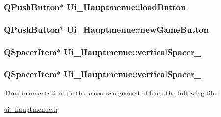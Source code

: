 \hypertarget{classUi__Hauptmenue_a9f1fdc0227d3ef11b7b7960a97b02f0d}{
\subsubsection[{load\-Button}]{\setlength{\rightskip}{0pt plus 5cm}Q\-Push\-Button$\ast$ Ui\-\_\-\-Hauptmenue\-::load\-Button}}\label{classUi__Hauptmenue_a9f1fdc0227d3ef11b7b7960a97b02f0d}
\hypertarget{classUi__Hauptmenue_a1ba53453bc65f18d70d89ce1bb5e242b}{
\subsubsection[{new\-Game\-Button}]{\setlength{\rightskip}{0pt plus 5cm}Q\-Push\-Button$\ast$ Ui\-\_\-\-Hauptmenue\-::new\-Game\-Button}}\label{classUi__Hauptmenue_a1ba53453bc65f18d70d89ce1bb5e242b}
\hypertarget{classUi__Hauptmenue_a49a9051523254188bf00ad9086998099}{
\subsubsection[{vertical\-Spacer\-\_\-4}]{\setlength{\rightskip}{0pt plus 5cm}Q\-Spacer\-Item$\ast$ Ui\-\_\-\-Hauptmenue\-::vertical\-Spacer\-\_}}\label{classUi__Hauptmenue_a49a9051523254188bf00ad9086998099}
\hypertarget{classUi__Hauptmenue_a7ed9d53442254ca6b34ad7e9f9dfe7a3}{
\subsubsection[{vertical\-Spacer\-\_\-5}]{\setlength{\rightskip}{0pt plus 5cm}Q\-Spacer\-Item$\ast$ Ui\-\_\-\-Hauptmenue\-::vertical\-Spacer\-\_}}\label{classUi__Hauptmenue_a7ed9d53442254ca6b34ad7e9f9dfe7a3}


The documentation for this class was generated from the following file\-:\begin{DoxyCompactItemize}
\item 
\hyperlink{ui__hauptmenue_8h}{ui\-\_\-hauptmenue.\-h}\end{DoxyCompactItemize}
